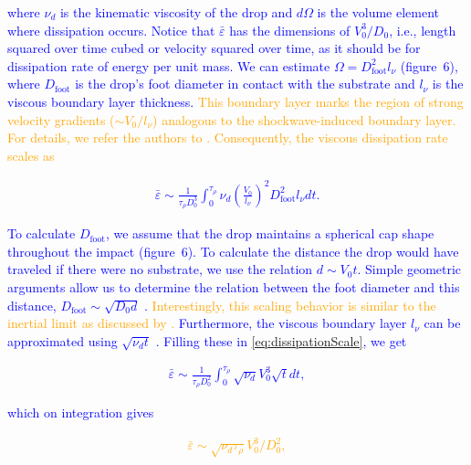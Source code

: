 \documentclass[]{article}
\newcommand*\blue{\textcolor{blue}}
\newcommand{\VS}[1]{{\textcolor{orange}{#1}}}
\begin{document}
\begin{enumerate}
	\noindent \blue{where $\nu_d$ is the kinematic viscosity of the drop and $d\Omega$ is the volume element where dissipation occurs. Notice that $\bar{\varepsilon}$ has the dimensions of $V_0^3/D_0$, i.e., length squared over time cubed or velocity squared over time, as it should be for dissipation rate of energy per unit mass. We can estimate $\Omega = D_{\text{foot}}^2l_\nu$ (figure~6), where $D_{\text{foot}}$ is the drop's foot diameter in contact with the substrate and $l_\nu$ is the viscous boundary layer thickness.} \VS{This boundary layer marks the region of strong velocity gradients ($\sim V_0/l_\nu$) analogous to the \citet{mirels1955laminar} shockwave-induced boundary layer. For details, we refer the authors to \citet{schlichting2016boundary, Schroll2010, Philippi2016}. Consequently, the viscous dissipation rate scales as}
	
	\blue{\begin{align}\label{eq:dissipationScale}
			\bar{\varepsilon} \sim \frac{1}{\tau_\rho D_0^3}\int_0^{\tau_\rho}\nu_d \left(\frac{V_0}{l_\nu}\right)^2 D_{\text{foot}}^2l_\nu dt.
	\end{align}}
	
	\noindent \blue{To calculate $D_{\text{foot}}$, we assume that the drop maintains a spherical cap shape throughout the impact (figure~6). To calculate the distance the drop would have traveled if there were no substrate, we use the relation $d \sim V_0t$. Simple geometric arguments allow us to determine the relation between the foot diameter and this distance, $D_{\text{foot}} \sim \sqrt{D_0d}$ \citep{lesser1981analytic, mandre2009precursors,  zheng2021air, bilotto2023fluid, bertin2023similarity}.} \VS{Interestingly, this scaling behavior is similar to the inertial limit \citep{wagner1932stoss, Bouwhuis2012, Philippi2016, gordillo2019theory} as discussed by \citet{langley2017impact, bilotto2023fluid}.} \blue{Furthermore, the viscous boundary layer $l_\nu$ can be approximated using $\sqrt{\nu_d t}$ \citep{mirels1955laminar, Eggers2010, Philippi2016}. Filling these in \eqref{eq:dissipationScale}, we get}
	
	\blue{\begin{align}	
			\bar{\varepsilon} \sim \frac{1}{\tau_\rho D_0^2}\int_0^{\tau_\rho}\sqrt{\nu_d} V_0^3 \sqrt{t} dt,
	\end{align}}
	
	\noindent \blue{which on integration gives}
	
	\VS{\begin{align}\label{eq:eps0Final}
			\bar{\varepsilon} \sim \sqrt{\nu_d \tau_\rho}V_0^3/D_0^2, 
	\end{align}}
	

\end{enumerate}
\end{document}
